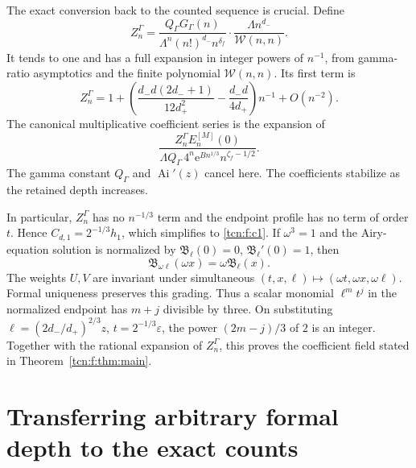 \documentclass[11pt,letterpaper]{article}
\newcommand{\Ai}{\operatorname{Ai}}
\newcommand{\eps}{\varepsilon}
\newcommand{\ee}{\mathrm e}
\theoremstyle{remark}
\begin{document}
The exact conversion back to the counted sequence is crucial. Define
\begin{equation}\label{tcn:f:Z}
 Z^\Gamma_n=\frac{Q_\Gamma G_\Gamma(n)}{\Lambda^n(n!)^{d_-} n^{\delta_f}}\cdot
             \frac{\Lambda n^{d_-}}{\mathcal W(n,n)}.
\end{equation}
It tends to one and has a full expansion in integer powers of $n^{-1}$, from gamma-ratio asymptotics and the finite polynomial $\mathcal W(n,n)$. Its first term is
\begin{equation}\label{tcn:f:Zfirst}
 Z^\Gamma_n=1+\left(\frac{d_-d(2d_-+1)}{12d_+^2}-\frac{d_-d}{4d_+}\right)n^{-1}
       +O(n^{-2}).
\end{equation}
The canonical multiplicative coefficient series is the expansion of
\begin{equation}\label{tcn:f:endpointseries}
 \frac{Z^\Gamma_nE_n^{[M]}(0)}
 {\Lambda Q_\Gamma\,4^n\ee^{Bn^{1/3}}n^{\zeta_f-1/2}}.
\end{equation}
The gamma constant $Q_\Gamma$ and $\Ai'(z)$ cancel here. The coefficients stabilize as the retained depth increases.

In particular, $Z^\Gamma_n$ has no $n^{-1/3}$ term and the endpoint profile has no term of order $t$. Hence $C_{d,1}=2^{-1/3}h_1$, which simplifies to \eqref{tcn:f:c1}. If $\omega^3=1$ and the Airy-equation solution is normalized by $\mathfrak B_\ell(0)=0$, $\mathfrak B_\ell'(0)=1$, then
\[
 \mathfrak B_{\omega\ell}(\omega x)=\omega\mathfrak B_\ell(x).
\]
The weights $U,V$ are invariant under simultaneous $(t,x,\ell)\mapsto(\omega t,\omega x,\omega\ell)$. Formal uniqueness preserves this grading. Thus a scalar monomial $\ell^mt^j$ in the normalized endpoint has $m+j$ divisible by three. On substituting $\ell=(2d_-/d_+)^{2/3}z$, $t=2^{-1/3}\eps$, the power $(2m-j)/3$ of $2$ is an integer. Together with the rational expansion of $Z^\Gamma_n$, this proves the coefficient field stated in Theorem~\ref{tcn:f:thm:main}.

\section{Transferring arbitrary formal depth to the exact counts}\label{tcn:f:sec:transfer}
\end{document}
